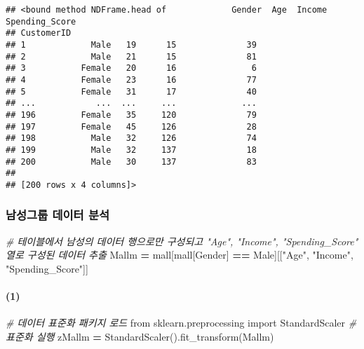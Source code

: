 \documentclass[
]{article}
\newenvironment{Shaded}{\begin{snugshade}}{\end{snugshade}}
\newcommand{\CommentTok}[1]{\textcolor[rgb]{0.56,0.35,0.01}{\textit{#1}}}
\newcommand{\ImportTok}[1]{#1}
\newcommand{\NormalTok}[1]{#1}
\newcommand{\OperatorTok}[1]{\textcolor[rgb]{0.81,0.36,0.00}{\textbf{#1}}}
\newcommand{\StringTok}[1]{\textcolor[rgb]{0.31,0.60,0.02}{#1}}
\begin{document}
\begin{verbatim}
## <bound method NDFrame.head of             Gender  Age  Income  Spending_Score
## CustomerID                                     
## 1             Male   19      15              39
## 2             Male   21      15              81
## 3           Female   20      16               6
## 4           Female   23      16              77
## 5           Female   31      17              40
## ...            ...  ...     ...             ...
## 196         Female   35     120              79
## 197         Female   45     126              28
## 198           Male   32     126              74
## 199           Male   32     137              18
## 200           Male   30     137              83
## 
## [200 rows x 4 columns]>
\end{verbatim}

\hypertarget{uxb0a8uxc131uxadf8uxb8f9-uxb370uxc774uxd130-uxbd84uxc11d-1}{%
\subsubsection{남성그룹 데이터
분석}\label{uxb0a8uxc131uxadf8uxb8f9-uxb370uxc774uxd130-uxbd84uxc11d-1}}

\begin{Shaded}
\begin{Highlighting}[]
\CommentTok{\# 테이블에서 남성의 데이터 행으로만 구성되고 "Age", "Income", "Spending\_Score" 열로 구성된 데이터 추출}
\NormalTok{Mallm }\OperatorTok{=}\NormalTok{ mall[mall[}\StringTok{\textquotesingle{}Gender\textquotesingle{}}\NormalTok{] }\OperatorTok{==} \StringTok{\textquotesingle{}Male\textquotesingle{}}\NormalTok{][[}\StringTok{"Age"}\NormalTok{, }\StringTok{"Income"}\NormalTok{, }\StringTok{"Spending\_Score"}\NormalTok{]]}
\end{Highlighting}
\end{Shaded}

\hypertarget{section-15}{%
\paragraph{(1)}\label{section-15}}

\begin{Shaded}
\begin{Highlighting}[]
\CommentTok{\# 데이터 표준화 패키지 로드}
\ImportTok{from}\NormalTok{ sklearn.preprocessing }\ImportTok{import}\NormalTok{ StandardScaler}
\CommentTok{\# 표준화 실행}
\NormalTok{zMallm }\OperatorTok{=}\NormalTok{ StandardScaler().fit\_transform(Mallm)}
\end{Highlighting}
\end{Shaded}
\end{document}
